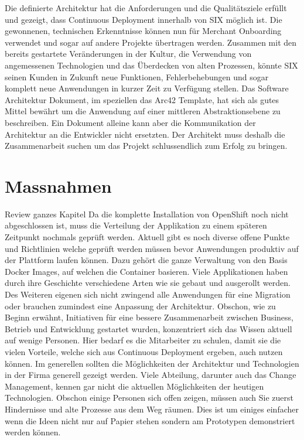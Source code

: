 Die definierte Architektur hat die Anforderungen und die Qualitätsziele erfüllt und gezeigt, dass Continuous Deployment innerhalb von SIX möglich ist. Die gewonnenen, technischen Erkenntnisse können nun für Merchant Onboarding verwendet und sogar auf andere Projekte übertragen werden. Zusammen mit den bereits gestartete Veränderungen in der Kultur, die Verwendung von angemessenen Technologien und das Überdecken von alten Prozessen, könnte SIX seinen Kunden in Zukunft neue Funktionen, Fehlerbehebungen und sogar komplett neue Anwendungen in kurzer Zeit zu Verfügung stellen.\newline
Das Software Architektur Dokument, im speziellen das Arc42 Template, hat sich als gutes Mittel bewährt um die Anwendung auf einer mittleren Abstraktionsebene zu beschreiben. Ein Dokument alleine kann aber die Kommunikation der Architektur an die Entwickler nicht ersetzten. Der Architekt muss deshalb die Zusammenarbeit suchen um das Projekt schlussendlich zum Erfolg zu bringen.

\chapter{Massnahmen}
{\color{red} Review ganzes Kapitel}
Da die komplette Installation von OpenShift noch nicht abgeschlossen ist, muss die Verteilung der Applikation zu einem späteren Zeitpunkt nochmals geprüft werden. Aktuell gibt es noch diverse offene Punkte und Richtlinien welche geprüft werden müssen bevor Anwendungen produktiv auf der Plattform laufen können. Dazu gehört die ganze Verwaltung von den Basis Docker Images, auf welchen die Container basieren. Viele Applikationen haben durch ihre Geschichte verschiedene Arten wie sie gebaut und ausgerollt werden. Des Weiteren eigenen sich nicht zwingend alle Anwendungen für eine Migration oder brauchen zumindest eine Anpassung der Architektur. Obschon, wie zu Beginn erwähnt, Initiativen für eine bessere Zusammenarbeit zwischen Business, Betrieb und Entwicklung gestartet wurden, konzentriert sich das Wissen aktuell auf wenige Personen. Hier bedarf es die Mitarbeiter zu schulen, damit sie die vielen Vorteile, welche sich aus Continuous Deployment ergeben, auch nutzen können.\newline
Im generellen sollten die Möglichkeiten der Architektur und Technologien in der Firma generell gezeigt werden. Viele Abteilung, darunter auch das Change Management, kennen gar nicht die aktuellen Möglichkeiten der heutigen Technologien. Obschon einige Personen sich offen zeigen, müssen auch Sie zuerst Hindernisse und alte Prozesse aus dem Weg räumen. Dies ist um einiges einfacher wenn die Ideen nicht nur auf Papier stehen sondern am Prototypen demonstriert werden können.